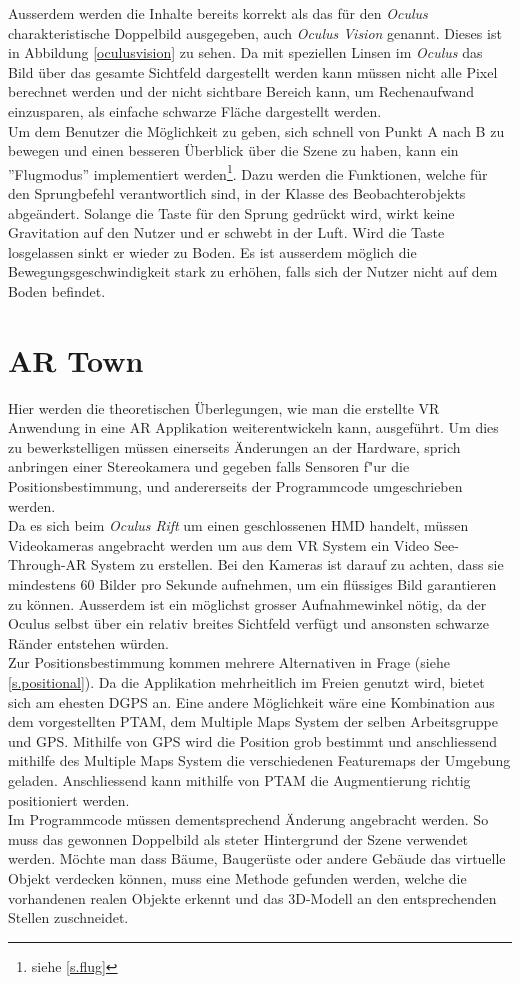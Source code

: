  Ausserdem werden die Inhalte bereits korrekt als das für den \textit{Oculus} charakteristische Doppelbild ausgegeben, auch \textit{Oculus Vision} genannt. Dieses ist in Abbildung \ref{oculusvision} zu sehen. Da mit speziellen Linsen im \textit{Oculus} das Bild über das gesamte Sichtfeld dargestellt werden kann müssen nicht alle Pixel berechnet werden und der nicht sichtbare Bereich kann, um Rechenaufwand einzusparen, als einfache schwarze Fläche dargestellt werden.\\[6pt]
Um dem Benutzer die Möglichkeit zu geben, sich schnell von Punkt A nach B zu bewegen und einen besseren Überblick über die Szene zu haben, kann ein ''Flugmodus'' implementiert werden\footnote{siehe \ref{s.flug}}. Dazu werden die Funktionen, welche für den Sprungbefehl verantwortlich sind, in der Klasse des Beobachterobjekts abgeändert. Solange die Taste für den Sprung gedrückt wird, wirkt keine Gravitation auf den Nutzer und er schwebt in der Luft. Wird die Taste losgelassen sinkt er wieder zu Boden. Es ist ausserdem möglich die Bewegungsgeschwindigkeit stark zu erhöhen, falls sich der Nutzer nicht auf dem Boden befindet.

\section{AR Town}\label{c.artown}
Hier werden die theoretischen Überlegungen, wie man die erstellte VR Anwendung in eine AR Applikation weiterentwickeln kann, ausgeführt. Um dies zu bewerkstelligen müssen einerseits Änderungen an der Hardware, sprich anbringen einer Stereokamera und gegeben falls Sensoren f"ur die Positionsbestimmung, und andererseits der Programmcode umgeschrieben werden.\\[6pt]
Da es sich beim \textit{Oculus Rift} um einen geschlossenen HMD handelt, müssen Videokameras angebracht werden um aus dem VR System ein Video See-Through-AR System zu erstellen. Bei den Kameras ist darauf zu achten, dass sie mindestens 60 Bilder pro Sekunde aufnehmen, um ein flüssiges Bild garantieren zu können. Ausserdem ist ein möglichst grosser Aufnahmewinkel nötig, da der Oculus selbst über ein relativ breites Sichtfeld verfügt und ansonsten schwarze Ränder entstehen würden.\cite{website:arrift}\\[6pt]
Zur Positionsbestimmung kommen mehrere Alternativen in Frage (siehe \ref{s.positional}). Da die Applikation mehrheitlich im Freien genutzt wird, bietet sich am ehesten DGPS an. Eine andere Möglichkeit wäre eine Kombination aus dem vorgestellten PTAM, dem Multiple Maps System der selben Arbeitsgruppe\cite{website:multimaps} und GPS. Mithilfe von GPS wird die Position grob bestimmt und anschliessend mithilfe des Multiple Maps System die verschiedenen Featuremaps der Umgebung geladen. Anschliessend kann mithilfe von PTAM die Augmentierung richtig positioniert werden.\\[6pt]
\newpage
Im Programmcode müssen dementsprechend Änderung angebracht werden. So muss das gewonnen Doppelbild als steter Hintergrund der Szene verwendet werden. Möchte man dass Bäume, Baugerüste oder andere Gebäude das virtuelle Objekt verdecken können, muss eine Methode gefunden werden, welche die vorhandenen realen Objekte erkennt und das 3D-Modell an den entsprechenden Stellen zuschneidet.

